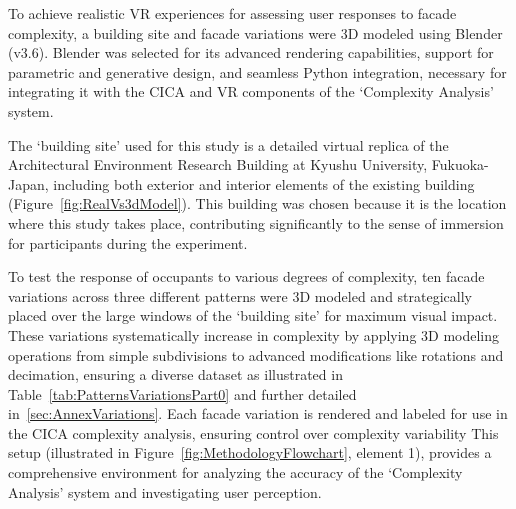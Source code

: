 %    



To achieve realistic VR experiences for assessing user responses to facade complexity, a building site and facade variations were 3D modeled using Blender (v3.6).
Blender was selected for its advanced rendering capabilities, support for parametric and generative design, and seamless Python integration, necessary for integrating it with the CICA and VR components of the `Complexity Analysis' system.

The `building site' used for this study is a detailed virtual replica of the Architectural Environment Research Building at Kyushu University, Fukuoka-Japan, including both exterior and interior elements of the existing building (Figure~\ref{fig:RealVs3dModel}). This building was chosen because it is the location where this study takes place, contributing significantly to the sense of immersion for participants during the experiment.

To test the response of occupants to various degrees of complexity, ten facade variations across three different patterns were 3D modeled and strategically placed over the large windows of the `building site' for maximum visual impact.
These variations systematically increase in complexity by applying 3D modeling operations from simple subdivisions to advanced modifications like rotations and decimation, ensuring a diverse dataset as illustrated in Table~\ref{tab:PatternsVariationsPart0} and further detailed in~\ref{sec:AnnexVariations}.
Each facade variation is rendered and labeled for use in the CICA complexity analysis, ensuring control over complexity variability%
This setup (illustrated in  Figure~\ref{fig:MethodologyFlowchart}, element 1), provides a comprehensive environment for analyzing the accuracy of the `Complexity Analysis' system and investigating user perception.


